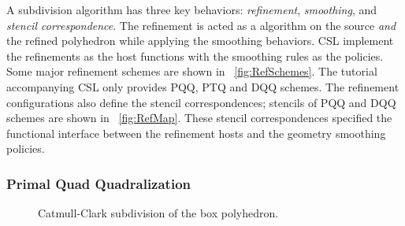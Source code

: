A subdivision algorithm has three key behaviors: \emph{refinement}, 
\emph{smoothing}, and \emph{stencil correspondence}. The refinement is
acted as a  algorithm on the source \emph{and}
the refined polyhedron while applying the smoothing behaviors. CSL
implement the refinements as the host functions with the smoothing
rules as the policies. Some major refinement schemes are shown in
\figurename\ \ref{fig:RefSchemes}. The tutorial accompanying CSL only
provides PQQ, PTQ and DQQ schemes. The refinement configurations 
also define the stencil correspondences; stencils of PQQ and DQQ 
schemes are shown in \figurename\ \ref{fig:RefMap}. 
These stencil correspondences 
specified the functional interface between the refinement hosts 
and the geometry smoothing policies.



\subsubsection*{Primal Quad Quadralization}

\begin{figure}[htb]
    \caption{Catmull-Clark subdivision of the box polyhedron.}
    \label{fig:cc}
\end{figure}


